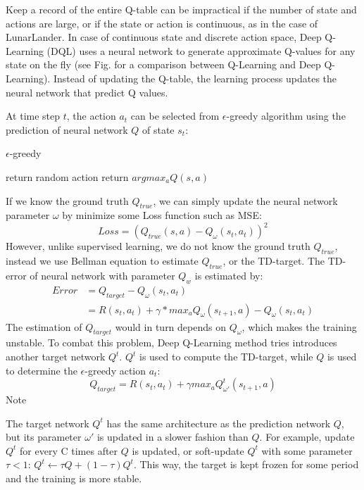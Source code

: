 \documentclass[conference]{IEEEtran}
\begin{document}
Keep a record of the entire Q-table can be impractical if the number of state and actions are large, or if the state or action is continuous, as in the case of LunarLander. In case of continuous state and discrete action space, Deep Q-Learning (DQL) uses a neural network to generate approximate Q-values for any state on the fly (see Fig. for a comparison between Q-Learning and Deep Q-Learning). Instead of updating the Q-table, the learning process updates the neural network that predict Q values.

At time step $t$, the action $a_t$ can be selected from $\epsilon$-greedy algorithm using the prediction of neural network $Q$ of state $s_t$:

\begin{algorithm}[h!]
	\caption{$\epsilon$-greedy}
\begin{algorithmic}
		\State return random action
	\Else
		\State return $argmax_a Q(s, a)$
	\EndIf
	\EndFunction
\end{algorithmic}
\label{algo:seq}
\end{algorithm}

If we know the ground truth $Q_{true}$, we can simply update the neural network parameter $\omega$ by minimize some Loss function such as MSE:
\begin{equation}
Loss = (Q_{true}(s, a) - Q_\omega(s_t, a_t))^2
\end{equation}
However, unlike supervised learning, we do not know the ground truth $Q_{true}$, instead we use Bellman equation to estimate $Q_{true}$, or the TD-target. The TD-error of neural network with parameter $Q_w$ is estimated by:
\begin{align}
Error &= Q_{target} - Q_\omega(s_t, a_t)  \\
&= R(s_t, a_t) + \gamma * max_a Q_{\omega}(s_{t+1}, a) - Q_\omega(s_t, a_t)
\end{align}
The estimation of $Q_{target}$ would in turn depends on $Q_\omega$, which makes the training unstable. To combat this problem, Deep Q-Learning method tries introduces another target network $Q^t$. $Q^t$ is used to compute the TD-target, while $Q$ is used to determine the 
$\epsilon$-greedy action $a_t$:
\begin{equation}
Q_{target} = R(s_t, a_t) + \gamma max_a Q^t_{\omega'}(s_{t+1}, a)
\label{eq:tdtarget}
\end{equation}
Note 

The target network $Q^t$ has the same architecture as the prediction network $Q$, but its parameter $\omega'$ is updated in a slower fashion than $Q$. For example, update $Q^t$ for every C times after $Q$ is updated, or soft-update $Q^t$ with some parameter $\tau<1$:
$Q^t \leftarrow \tau Q + (1-\tau) Q^t$. This way, the target is kept frozen for some period and the training is more stable.
\end{document}

